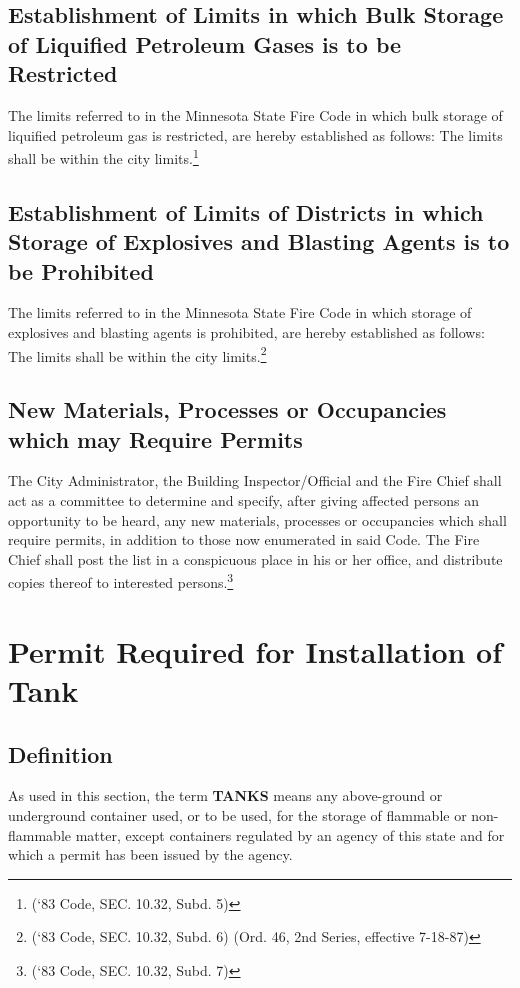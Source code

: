 \subsection{Establishment of Limits in which Bulk Storage of Liquified Petroleum Gases is to be Restricted}
The limits referred to in the Minnesota State Fire Code in which bulk storage of liquified petroleum gas is restricted, are hereby established as follows: The limits shall be within the city limits.\footnote{(‘83 Code, SEC. 10.32, Subd. 5)}
\subsection{Establishment of Limits of Districts in which Storage of Explosives and Blasting Agents is to be Prohibited}
The limits referred to in the Minnesota State Fire Code in which storage of explosives and blasting agents is prohibited, are hereby established as follows: The limits shall be within the city limits.\footnote{(‘83 Code, SEC. 10.32, Subd. 6)  (Ord. 46, 2nd Series, effective 7-18-87)}
\subsection{New Materials, Processes or Occupancies which may Require Permits}
The City Administrator, the Building Inspector/Official and the Fire Chief shall act as a committee to determine and specify, after giving affected persons an opportunity to be heard, any new materials, processes or occupancies which shall require permits, in addition to those now enumerated in said Code. The Fire Chief shall post the list in a conspicuous place in his or her office, and distribute copies thereof to interested persons.\footnote{(‘83 Code, SEC. 10.32, Subd. 7)}


\setcounter{section}{14}
\section{Permit Required for Installation of Tank}
\subsection{Definition}
As used in this section, the term \textbf{TANKS} means any above-ground or underground container used, or to be used, for the storage of flammable or non-flammable matter, except containers regulated by an agency of this state and for which a permit has been issued by the agency.
